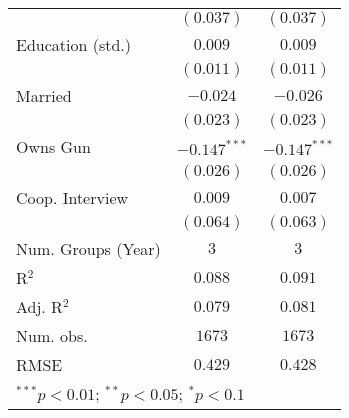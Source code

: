 \begin{table}
\begin{center}
\begin{tabular}{l c c}
                        & $(0.037)$      & $(0.037)$      \\
Education (std.)        & $0.009$        & $0.009$        \\
                        & $(0.011)$      & $(0.011)$      \\
Married                 & $-0.024$       & $-0.026$       \\
                        & $(0.023)$      & $(0.023)$      \\
Owns Gun                & $-0.147^{***}$ & $-0.147^{***}$ \\
                        & $(0.026)$      & $(0.026)$      \\
Coop. Interview         & $0.009$        & $0.007$        \\
                        & $(0.064)$      & $(0.063)$      \\
\midrule
Num. Groups (Year)      & $3$            & $3$            \\
R$^2$                   & $0.088$        & $0.091$        \\
Adj. R$^2$              & $0.079$        & $0.081$        \\
Num. obs.               & $1673$         & $1673$         \\
RMSE                    & $0.429$        & $0.428$        \\
\bottomrule
\multicolumn{3}{l}{\scriptsize{$^{***}p<0.01$; $^{**}p<0.05$; $^{*}p<0.1$}}
\end{tabular}
\label{table_ate_10+_fatalities}
\end{center}
\end{table}
